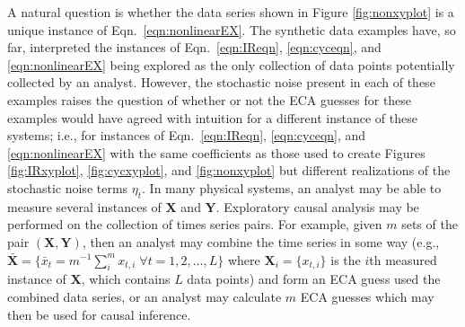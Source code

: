 \documentclass{article}[10pt]
\begin{document}
A natural question is whether the data series shown in Figure \ref{fig:nonxyplot} is a unique instance of Eqn.\ \ref{eqn:nonlinearEX}.  The synthetic data examples have, so far, interpreted the instances of Eqn.\ \ref{eqn:IReqn}, \ref{eqn:cyceqn}, and \ref{eqn:nonlinearEX} being explored as the only collection of data points potentially collected by an analyst.  However, the stochastic noise present in each of these examples raises the question of whether or not the ECA guesses for these examples would have agreed with intuition for a different instance of these systems; i.e., for instances of Eqn.\ \ref{eqn:IReqn}, \ref{eqn:cyceqn}, and \ref{eqn:nonlinearEX} with the same coefficients as those used to create Figures \ref{fig:IRxyplot}, \ref{fig:cycxyplot}, and \ref{fig:nonxyplot} but different realizations of the stochastic noise terms $\eta_t$.  In many physical systems, an analyst may be able to measure several instances of $\mathbf{X}$ and $\mathbf{Y}$.  Exploratory causal analysis may be performed on the collection of times series pairs.  For example, given $m$ sets of the pair $(\mathbf{X},\mathbf{Y})$, then an analyst may combine the time series in some way (e.g., $\bar{\mathbf{X}}=\{\bar{x}_t=m^{-1}\sum^m_i x_{t,i}\;\forall t=1,2,\ldots,L\}$ where $\mathbf{X}_i = \{x_{t,i}\}$ is the $i$th measured instance of $\mathbf{X}$, which contains $L$ data points) and form an ECA guess used the combined data series, or an analyst may calculate $m$ ECA guesses which may then be used for causal inference.  
\end{document}
